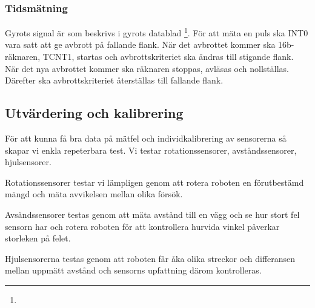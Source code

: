 \subsubsection{Tidsmätning}

Gyrots signal är som beskrivs i gyrots datablad
\footnote{}.
För att mäta en puls ska INT0 vara satt att ge avbrott på fallande flank. När
det avbrottet kommer ska 16b-räknaren, TCNT1, startas och avbrottskriteriet ska
ändras till stigande flank. När det nya avbrottet kommer ska räknaren stoppas,
avläsas och nollställas. Därefter ska avbrottskriteriet återställas till
fallande flank.

\subsection{Utvärdering och kalibrering}
För att kunna få bra data på mätfel och individkalibrering av sensorerna så
skapar vi enkla repeterbara test. Vi testar rotationssensorer, avståndssensorer,
hjulsensorer.

Rotationssensorer testar vi lämpligen genom att rotera roboten en förutbestämd
mängd och mäta avvikelsen mellan olika försök.

Avsåndssensorer testas genom att mäta avstånd till en vägg och se hur stort fel
sensorn har och rotera roboten för att kontrollera hurvida vinkel påverkar 
storleken på felet.

Hjulsensorerna testas genom att roboten får åka olika streckor och differansen
mellan uppmätt avstånd och sensorns upfattning därom kontrolleras.
